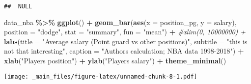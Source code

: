 \documentclass[
]{book}
\newenvironment{Shaded}{\begin{snugshade}}{\end{snugshade}}
\newcommand{\AttributeTok}[1]{\textcolor[rgb]{0.13,0.29,0.53}{#1}}
\newcommand{\CommentTok}[1]{\textcolor[rgb]{0.56,0.35,0.01}{\textit{#1}}}
\newcommand{\FunctionTok}[1]{\textcolor[rgb]{0.13,0.29,0.53}{\textbf{#1}}}
\newcommand{\NormalTok}[1]{#1}
\newcommand{\SpecialCharTok}[1]{\textcolor[rgb]{0.81,0.36,0.00}{\textbf{#1}}}
\newcommand{\StringTok}[1]{\textcolor[rgb]{0.31,0.60,0.02}{#1}}
\begin{document}
\begin{verbatim}
##  NULL
\end{verbatim}

\begin{Shaded}
\begin{Highlighting}[]
\NormalTok{data\_nba }\SpecialCharTok{\%\textgreater{}\%} 
  \FunctionTok{ggplot}\NormalTok{() }\SpecialCharTok{+}
  \FunctionTok{geom\_bar}\NormalTok{(}\FunctionTok{aes}\NormalTok{(}\AttributeTok{x =}\NormalTok{ position\_pg, }
               \AttributeTok{y =}\NormalTok{ salary),}
           \AttributeTok{position =} \StringTok{"dodge"}\NormalTok{,}
           \AttributeTok{stat =} \StringTok{"summary"}\NormalTok{,}
           \AttributeTok{fun =} \StringTok{"mean"}\NormalTok{) }\SpecialCharTok{+} 
  \CommentTok{\#xlim(0, 10000000) +}
  \FunctionTok{labs}\NormalTok{(}\AttributeTok{title =} \StringTok{"Average salary (Point guard vs other positions)"}\NormalTok{,}
       \AttributeTok{subtitle =} \StringTok{"this is not that interesting"}\NormalTok{,}
       \AttributeTok{caption =} \StringTok{"Authors\textquotesingle{} calculation; NBA data 1998{-}2018"}\NormalTok{) }\SpecialCharTok{+}
  \FunctionTok{xlab}\NormalTok{(}\StringTok{"Player\textquotesingle{}s position"}\NormalTok{) }\SpecialCharTok{+}
  \FunctionTok{ylab}\NormalTok{(}\StringTok{"Player\textquotesingle{}s salary"}\NormalTok{) }\SpecialCharTok{+}
  \FunctionTok{theme\_minimal}\NormalTok{()}
\end{Highlighting}
\end{Shaded}

\texttt{[image: \_main\_files/figure-latex/unnamed-chunk-8-1.pdf]}
\end{document}

